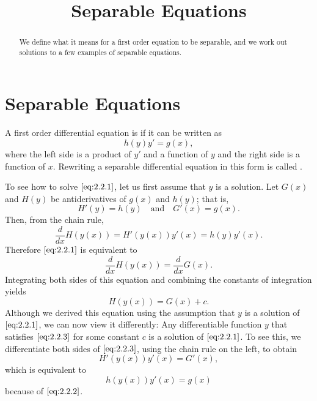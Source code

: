 \documentclass{ximera}
\title{Separable Equations}
\begin{document}
 
\begin{abstract}
We define what it means for a first order equation to be separable, and we work out solutions to a few examples of separable equations.
\end{abstract}
 
\maketitle
 
\section*{Separable Equations}
 
 
A first order differential equation  is   if it can be written as
\begin{equation} \label{eq:2.2.1}
h(y)y'=g(x),
\end{equation}
where the left side is a product of $y'$ and a function of $y$ and
the right side is a function of $x$. Rewriting a separable
differential equation in this form is called .
 
 
To see how to solve $\eqref{eq:2.2.1}$, let us first assume that $y$
is a solution.
Let $G(x)$ and $H(y)$ be antiderivatives of $g(x)$
and $h(y)$; that is,
\begin{equation} \label{eq:2.2.2}
H'(y)=h(y)\quad\text{and}\quad G'(x)=g(x).
\end{equation}
Then, from the chain rule,
$$
\frac{d}{dx}H(y(x))=H'(y(x))y'(x)=h(y)y'(x).
$$
Therefore $\eqref{eq:2.2.1}$ is equivalent to
$$
\frac{d}{dx}H(y(x))=\frac{d}{dx}G(x).
$$
Integrating both sides of this equation and combining the constants of
integration yields
\begin{equation} \label{eq:2.2.3}
H(y(x))=G(x)+c.
\end{equation}
Although we derived this equation using the assumption that $y$
is a solution of $\eqref{eq:2.2.1}$, we can now view it differently:
Any differentiable function $y$ that satisfies $\eqref{eq:2.2.3}$
for some constant $c$ is a solution of $\eqref{eq:2.2.1}$. To see this, we
differentiate both sides of $\eqref{eq:2.2.3}$, using the chain rule on the
left, to obtain
$$
H'(y(x))y'(x)=G'(x),
$$
which is equivalent to
$$
h(y(x))y'(x)=g(x)
$$
because of $\eqref{eq:2.2.2}$.
 
\end{document}
